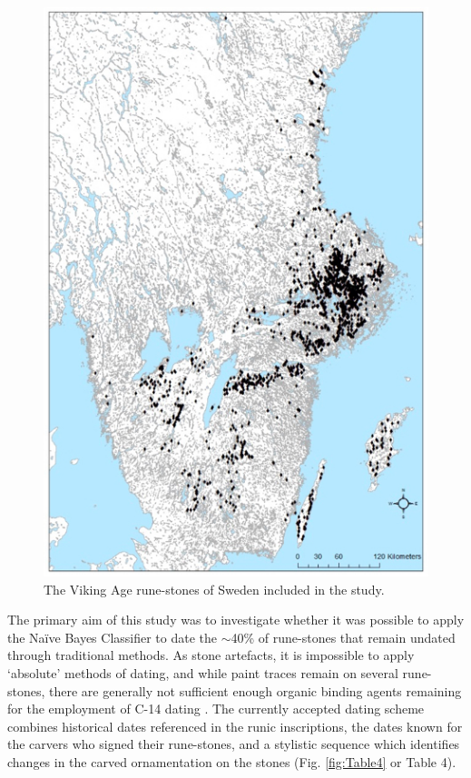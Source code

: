 \begin{figure}[!htb]
	\includegraphics[width=.95\linewidth]{figures/thoeming_Fig3}
	\centering
	\caption{The Viking Age rune-stones of Sweden included in the study.}
	\label{fig:Fig3}
\end{figure}


The primary aim of this study was to investigate whether it was possible to apply the Naïve Bayes Classifier to date the $\sim$40\% of rune-stones that remain undated through traditional methods. As stone artefacts, it is impossible to apply ‘absolute’ methods of dating, and while paint traces remain on several rune-stones, there are generally not sufficient enough organic binding agents remaining for the employment of C-14 dating \parencite[22]{Kitzler_2002}. The currently accepted dating scheme combines historical dates referenced in the runic inscriptions, the dates known for the carvers who signed their rune-stones, and a stylistic sequence which identifies changes in the carved ornamentation on the stones \parencite{Gräslund_2006}(Fig. \ref{fig:Table4} or Table 4).

